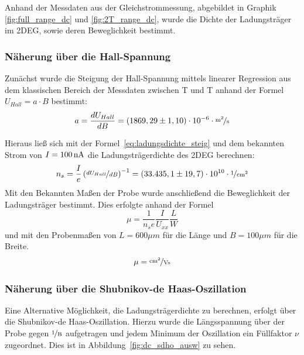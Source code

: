

Anhand der Messdaten aus der Gleichstrommessung, abgebildet in Graphik \ref{fig:full_range_dc} und \ref{fig:2T_range_dc}, wurde die Dichte der Ladungsträger im 2DEG, sowie deren Beweglichkeit bestimmt.

\subsubsection{Näherung über die Hall-Spannung}
\label{ch:naeherung_hall}

Zunächst wurde die Steigung der Hall-Spannung mittels linearer Regression aus dem klassischen Bereich der Messdaten zwischen \unit[-2]{T} und \unit[2]{T} anhand der Formel $ U_{Hall}=a\cdot B $  
bestimmt:
\begin{equation}
	a=\d{U_{Hall}}{B} = (1869,29 \pm 1,10)\cdot10^{-6} \cdot  \unitfrac{m^2}{s}
\end{equation}

Hieraus ließ sich mit der Formel~\eqref{eq:ladungsdichte_steig} und dem bekannten Strom von $I=\unit[100]{nA}$ die Ladungsträgerdichte des 2DEG berechnen: 
\begin{equation}
	n_s= \frac{I}{e}\left({\niced{U_{Hall}}{B}}\right)^{-1}=( 33.435,1 \pm 19,7) \cdot 10^{10}\cdot \unitfrac{1}{cm^2}
\end{equation}
Mit den Bekannten Maßen der Probe wurde anschließend die Beweglichkeit der Ladungsträger bestimmt. Dies erfolgte anhand der Formel \\
\begin{equation}
	\mu=\frac{1}{n_se}\frac{I}{U_{xx}}\frac{L}{W}
\end{equation}
und mit den Probenmaßen von $L=600\mu m$ für die Länge und
 $B=100\mu m$ für die Breite. \\
\begin{equation}
\mu= \unitfrac{cm^2}{Vs} %
\end{equation}
 
\subsubsection{Näherung über die Shubnikov-de Haas-Oszillation}
\label{ch:naeherung_sdho}

Eine Alternative Möglichkeit, die Ladungsträgerdichte zu berechnen, erfolgt über die Shubnikov-de Haas-Oszillation. Hierzu wurde die Längsspannung über der Probe 
 gegen $\unitfrac{1}{B}$ aufgetragen und jedem Minimum der Oszillation ein Füllfaktor $\nu$ zugeordnet. Dies ist in Abbildung~\ref{fig:dc_sdho_ausw} zu sehen. 

